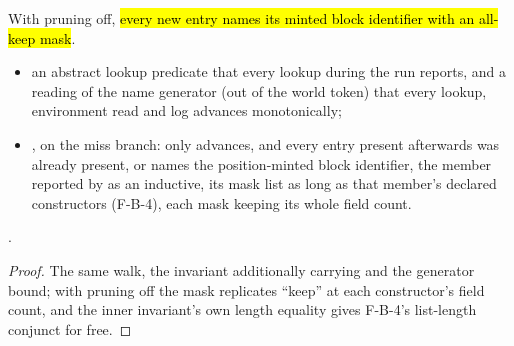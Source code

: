 \begin{theorem}
\label{thm:Erasure-run_register_inductive_cold_entries}
\leanok
{}
 With pruning off, \hl{every new entry names its minted block identifier with an
all-keep mask}.
\begin{itemize}
\item {} an abstract lookup predicate  that every lookup during the run reports,
and a reading  of the name generator (out of the world token) that every lookup,
environment read and log advances monotonically;
\item {}, on the miss branch:  only advances, and every entry present afterwards
was already present, or names the position-minted block identifier, the member reported by
 as an inductive, its mask list as long as that member's declared constructors (F-B-4),
each mask keeping its whole field count.
\end{itemize}
 \stProved{}.
\end{theorem}
\begin{proof}
\leanok
{}
 The same walk, the invariant additionally carrying  and the generator bound;
with pruning off the mask replicates ``keep'' at each constructor's field count, and the inner
 invariant's own length equality gives F-B-4's list-length conjunct for free.
\end{proof}

